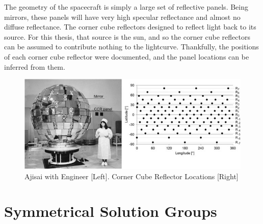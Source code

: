 The geometry of the spacecraft is simply a large set of reflective panels. Being mirrors, these panels will have very high specular reflectance and almost no diffuse reflectance. The corner cube reflectors designed to reflect light back to its source. For this thesis, that source is the sun, and so the corner cube reflectors can be assumed to contribute nothing to the lightcurve. Thankfully, the positions of each corner cube reflector were documented, and the panel locations can be inferred from them.

\begin{figure}
	\centering
	\includegraphics[width = 150mm]{figures/ajisai_panels.jpg}
	\caption{Ajisai with Engineer [Left]. Corner Cube Reflector Locations [Right] \cite{ajisai}}
\end{figure}

\section{Symmetrical Solution Groups}